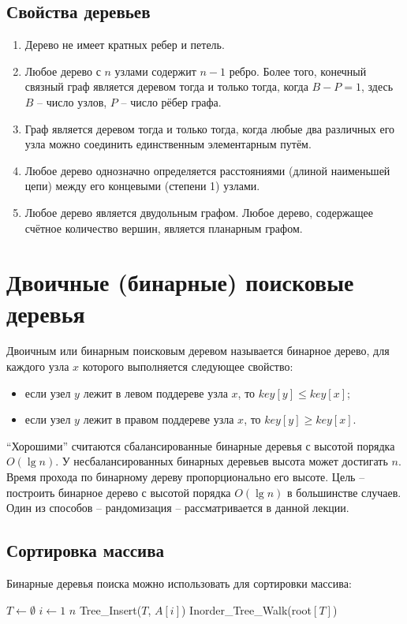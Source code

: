 \documentclass[11pt]{article}
\begin{document}
\subsection{Свойства деревьев}
\begin{enumerate}
\item Дерево не имеет кратных ребер и петель.
\item Любое дерево с $n$ узлами содержит $n-1$ ребро. Более того, конечный
  связный граф является деревом тогда и только тогда, когда $B-P = 1$,
  здесь $B$ -- число узлов, $P$ -- число рёбер графа.
\item Граф является деревом тогда и только тогда, когда любые два различных его
  узла можно соединить единственным элементарным путём.
\item Любое дерево однозначно определяется расстояниями (длиной наименьшей
  цепи) между его концевыми (степени 1) узлами.
\item Любое дерево является двудольным графом. Любое дерево, содержащее счётное
  количество вершин, является планарным графом.
\end{enumerate}

\section{Двоичные (бинарные) поисковые деревья}
Двоичным или бинарным поисковым деревом называется бинарное дерево, для
каждого узла $x$ которого выполняется следующее свойство:
\begin{itemize}
\item если узел $y$ лежит в левом поддереве узла $x$, то 
  $key[y] \leqslant key[x]$;
\item если узел $y$ лежит в правом поддереве узла $x$, то
  $key[y] \geqslant key[x]$.
\end{itemize}

``Хорошими'' считаются сбалансированные бинарные деревья с высотой
порядка $O(\lg n)$. У несбалансированных бинарных деревьев высота может
достигать $n$. Время прохода по бинарному дереву пропорционально его высоте.
Цель -- построить бинарное дерево с высотой порядка $O(\lg n)$ в большинстве
случаев. Один из способов -- рандомизация -- рассматривается в данной лекции.

\subsection{Сортировка массива}
Бинарные деревья поиска можно использовать для сортировки массива:
\begin{codebox}
\li $T \gets \emptyset $
\li \For $i \gets 1$ \To $n$
\li \Do Tree\_Insert($T$, $A[i]$)
  \End
\li Inorder\_Tree\_Walk(root$[T]$)
\end{codebox}
\end{document}
